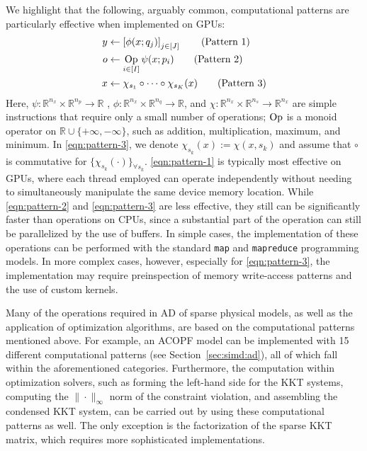 \documentclass{IEEEtran4PSCC} %
\begin{document}
We highlight that the following, arguably common, computational
patterns are particularly effective when implemented on GPUs:
\begin{align}
  y&\leftarrow \left[\phi(x; q_j)\right]_{j\in [J]}\tag{Pattern 1}\label{eqn:pattern-1}\\
  o&\leftarrow  \mathop{\rm{Op}}_{i\in [I]} \psi(x;p_i) \tag{Pattern 2}\label{eqn:pattern-2}\\
  x&\leftarrow  \chi_{s_1}\circ\cdots\circ \chi_{s_K}(x) \tag{Pattern 3}\label{eqn:pattern-3}
\end{align}
Here, $\psi:\mathbb{R}^{n_x}\times \mathbb{R}^{n_{p}}\rightarrow
\mathbb{R}$ , $\phi:\mathbb{R}^{n_x}\times
\mathbb{R}^{n_{q}}\rightarrow \mathbb{R}$, and
$\chi:\mathbb{R}^{n_x}\times \mathbb{R}^{n_{s}}\rightarrow
\mathbb{R}^{n_x}$ are simple instructions that require only a small number
of operations; $\mathop{\rm{Op}}$ is a monoid operator on
$\mathbb{R}\cup\{+\infty,-\infty\}$, such as addition, multiplication,
maximum, and minimum. In \ref{eqn:pattern-3}, we denote $\chi_{s_k}(x):=\chi(x,s_k)$ and
assume that $\circ$ is commutative for $\{\chi_{s_k}(\cdot)\}_{\forall
s_k}$. \ref{eqn:pattern-1} is typically most effective on GPUs, where
each thread employed can operate independently without needing to
simultaneously manipulate the same device memory location. While
\ref{eqn:pattern-2} and \ref{eqn:pattern-3} are less effective,
they still can be significantly
faster than operations on CPUs, since a substantial part of the operation
can still be parallelized by the use of buffers. In simple cases, the
implementation of these operations can be performed with the standard
{\tt map} and {\tt mapreduce} programming models. In more
complex cases, however, especially for \ref{eqn:pattern-3}, the implementation
may require preinspection of memory write-access patterns and the use
of custom kernels.

Many of the operations required in AD of sparse physical models, as
well as the application of optimization algorithms, are based on the
computational patterns mentioned above. For example, an ACOPF model
can be implemented with 15 different computational patterns (see
Section~\ref{sec:simd:ad}), all of which fall within the
aforementioned categories. Furthermore, the computation within
optimization solvers, such as forming the left-hand side for the KKT
systems, computing the $\|\cdot\|_\infty$ norm of the constraint
violation, and assembling the condensed KKT system, can be carried out
by using these computational patterns as well. The only exception is
the factorization of the sparse KKT matrix, which requires more
sophisticated implementations.
\end{document}

